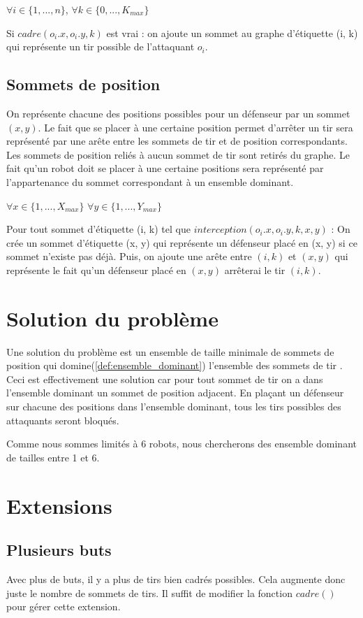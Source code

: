 \documentclass[12pt]{article}
\begin{document}
$\forall i \in \{1, ..., n\}$, $\forall k \in \{0, ..., K_{max} \}$

Si $cadre(o_i.x, o_i.y, k)$ est vrai : on ajoute un sommet au graphe d'étiquette (i, k) qui représente un tir possible de l'attaquant $o_i$. \bigbreak

\subsection{Sommets de position}
On représente chacune des positions possibles pour un défenseur par un sommet $(x, y)$.
Le fait que se placer à une certaine position permet d'arrêter un tir sera représenté par une arête entre les sommets de tir et de position correspondants.
Les sommets de position reliés à aucun sommet de tir sont retirés du graphe.
Le fait qu'un robot doit se placer à une certaine positions sera représenté par l'appartenance du sommet correspondant à un ensemble dominant.
\newline

$\forall x \in \{1, ..., X_{max}\}$ $\forall y \in \{1, ..., Y_{max}\}$ 

Pour tout sommet d'étiquette (i, k) tel que $interception(o_i.x, o_i.y, k, x, y)$ : On crée un sommet d'étiquette (x, y) qui représente un défenseur placé en (x, y) si ce sommet n'existe pas déjà. Puis, on ajoute une arête entre $(i, k)$ et $(x, y)$ qui représente le fait qu'un défenseur placé en $(x, y)$ arrêterai le tir $(i, k)$.

\section{Solution du problème}
Une solution du problème est un ensemble de taille minimale de sommets de position qui domine(\ref{def:ensemble_dominant}) l'ensemble des sommets de tir . Ceci est effectivement une solution car pour tout sommet de tir on a dans l'ensemble dominant un sommet de position adjacent. En plaçant un défenseur sur chacune des positions dans l'ensemble dominant, tous les tirs possibles des attaquants seront bloqués.

Comme nous sommes limités à 6 robots, nous chercherons des ensemble dominant de tailles entre 1 et 6.

\section{Extensions}
\subsection{Plusieurs buts}
Avec plus de buts, il y a plus de tirs bien cadrés possibles. Cela augmente donc juste le nombre de sommets de tirs. Il suffit de modifier la fonction $cadre()$ pour gérer cette extension.
\end{document}
